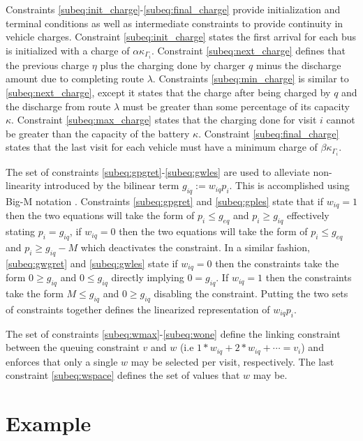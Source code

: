 \documentclass[letterpaper, 10pt, conference]{IEEEtran}
\begin{document}
Constraints \eqref{subeq:init_charge}-\eqref{subeq:final_charge} provide initialization and terminal conditions as well as intermediate constraints to provide continuity in vehicle charges. Constraint \eqref{subeq:init_charge} states the first arrival for each bus is initialized with a charge of \(\alpha \kappa_{\Gamma_i}\). Constraint \eqref{subeq:next_charge} defines that the previous charge \(\eta\) plus the charging done by charger \(q\) minus the discharge amount due to completing route \(\lambda\). Constraints \eqref{subeq:min_charge} is similar to \eqref{subeq:next_charge}, except it states that the charge after being charged by \(q\) and the discharge from route \(\lambda\) must be greater than some percentage of its capacity \(\kappa\). Constraint \eqref{subeq:max_charge} states that the charging done for visit \(i\) cannot be greater than the capacity of the battery \(\kappa\). Constraint \eqref{subeq:final_charge} states that the last visit for each vehicle must have a minimum charge of \(\beta \kappa_{\Gamma_i}\).

The set of constraints \eqref{subeq:gpgret}-\eqref{subeq:gwles} are used to alleviate non-linearity introduced by the bilinear term \(g_{iq} := w_{iq} p_i\). This is accomplished using Big-M notation \cite{Rodriguez2013}. Constraints \eqref{subeq:gpgret} and \eqref{subeq:gples} state that if \(w_{iq} = 1\) then the two equations will take the form of \(p_i \leq g_{eq}\) and \(p_i \geq g_{iq}\) effectively stating \(p_i = g_{iq}\), if \(w_{iq} = 0\) then the two equations will take the form of \(p_i \leq g_{eq}\) and \(p_i \geq g_{iq} - M\) which deactivates the constraint. In a similar fashion, \eqref{subeq:gwgret} and \eqref{subeq:gwles} state if \(w_{iq} = 0\) then the constraints take the form \(0 \geq g_{iq}\) and \(0 \leq g_{iq}\) directly implying \(0 = g_{iq}\). If \(w_{iq} = 1\) then the constraints take the form \(M \leq g_{iq}\) and \(0 \geq g_{iq}\) disabling the constraint. Putting the two sets of constraints together defines the linearized representation of \(w_{iq} p_i\).

The set of constraints \eqref{subeq:wmax}-\eqref{subeq:wone} define the linking constraint between the queuing constraint \(v\) and \(w\) (i.e \(1*w_{iq} + 2*w_{iq} + \cdots = v_i\)) and enforces that only a single \(w\) may be selected per visit, respectively. The last constraint \eqref{subeq:wspace} defines the set of values that \(w\) may be.
\section{Example}
\end{document}

